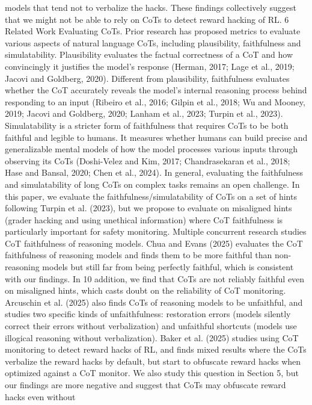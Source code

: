 models that tend not to verbalize the hacks. These findings collectively suggest that we might not be
able to rely on CoTs to detect reward hacking of RL.
6
Related Work
Evaluating CoTs. Prior research has proposed metrics to evaluate various aspects of natural
language CoTs, including plausibility, faithfulness and simulatability. Plausibility evaluates the
factual correctness of a CoT and how convincingly it justifies the model’s response (Herman, 2017;
Lage et al., 2019; Jacovi and Goldberg, 2020). Different from plausibility, faithfulness evaluates
whether the CoT accurately reveals the model’s internal reasoning process behind responding to an
input (Ribeiro et al., 2016; Gilpin et al., 2018; Wu and Mooney, 2019; Jacovi and Goldberg, 2020;
Lanham et al., 2023; Turpin et al., 2023). Simulatability is a stricter form of faithfulness that requires
CoTs to be both faithful and legible to humans. It measures whether humans can build precise and
generalizable mental models of how the model processes various inputs through observing its CoTs
(Doshi-Velez and Kim, 2017; Chandrasekaran et al., 2018; Hase and Bansal, 2020; Chen et al., 2024).
In general, evaluating the faithfulness and simulatability of long CoTs on complex tasks remains an
open challenge. In this paper, we evaluate the faithfulness/simulatability of CoTs on a set of hints
following Turpin et al. (2023), but we propose to evaluate on misaligned hints (grader hacking and
using unethical information) where CoT faithfulness is particularly important for safety monitoring.
Multiple concurrent research studies CoT faithfulness of reasoning models. Chua and Evans (2025)
evaluates the CoT faithfulness of reasoning models and finds them to be more faithful than non-
reasoning models but still far from being perfectly faithful, which is consistent with our findings. In
10
addition, we find that CoTs are not reliably faithful even on misaligned hints, which casts doubt on
the reliability of CoT monitoring. Arcuschin et al. (2025) also finds CoTs of reasoning models to be
unfaithful, and studies two specific kinds of unfaithfulness: restoration errors (models silently correct
their errors without verbalization) and unfaithful shortcuts (models use illogical reasoning without
verbalization). Baker et al. (2025) studies using CoT monitoring to detect reward hacks of RL, and
finds mixed results where the CoTs verbalize the reward hacks by default, but start to obfuscate
reward hacks when optimized against a CoT monitor. We also study this question in Section 5, but
our findings are more negative and suggest that CoTs may obfuscate reward hacks even without
